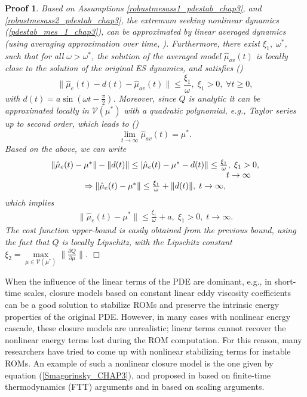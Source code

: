 \documentclass[letterpaper,conference,onecolumn,11pt]{IEEEtran}
\newtheorem{pf}{Proof}
\begin{document}
\begin{pf}
Based on Assumptions \ref{robustmesass1_pdestab_chap3}, and
\ref{robustmesass2_pdestab_chap3}, the extremum seeking nonlinear
dynamics (\ref{pdestab_mes_1_chap3}), can be approximated by
linear averaged dynamics (using averaging approximation over time,
\cite[p. 435, Definition 1]{Rote00}). Furthermore, there exist $
\xi_{1},\;\omega^{*}$, such that for all $\omega>\omega^{*}$, the
solution of the averaged model ${\hat\mu}_{av}(t)$ is locally
close to the solution of the original ES dynamics, and satisfies
(\cite[p. 436]{Rote00})
$$
\|{\hat\mu}_{e}(t)-d(t)-{\hat\mu}_{av}(t)\|
\leq\frac{\xi_{1}}{\omega},\;\xi_{1}>0,\;\forall t\geq 0,
$$
with $d(t)=a \sin(\omega t-\frac{\pi}{2})$. Moreover, since $Q$ is
analytic it can be approximated locally in $\mathcal{V}(\mu^{*})$
with a quadratic polynomial, e.g., Taylor series up to second
order, which leads to (\cite[p. 437]{Rote00})
$$
\lim_{t\rightarrow\infty}{\hat\mu}_{av}(t)=\mu^{*}.
$$
Based on the above, we can write
$$
\begin{array}{c}\|{\hat\mu}_{e}(t)-\mu^{*}\|-\|d(t)\|\leq |{\hat\mu}_{e}(t)-\mu^{*}-d(t)\|
\leq\frac{\xi_{1}}{\omega},\;\xi_{1}>0,\\\hspace{+7cm}t\rightarrow\infty\\
\Rightarrow \|{\hat\mu}_{e}(t)-\mu^{*}\|
\leq\frac{\xi_{1}}{\omega}+\|d(t)\|,\;t\rightarrow\infty,
\end{array}
$$
which implies
$$
\begin{array}{c}
\|{\hat\mu}_{e}(t)-\mu^{*}\|\leq
\frac{\xi_{1}}{\omega}+a,\;\xi_{1}>0,\;t\rightarrow\infty.
\end{array}
$$
The cost function upper-bound is easily obtained from the previous
bound, using the fact that $Q$ is locally Lipschitz, with the
Lipschitz constant
$\xi_{2}=\underset{\mu\in\mathcal{V}(\mu^{*})}\max \|
\frac{\partial{Q}}{\partial\mu} \|$.
 \hspace{+9cm}$\Box$
\end{pf}

When the influence of the linear terms of the PDE are dominant, e.g.,
in short-time scales, closure models based on constant linear eddy
viscosity coefficients can be a good solution to stabilize ROMs and
preserve the intrinsic energy properties of the original PDE. However,
in many cases with nonlinear energy cascade, these closure models are
unrealistic; linear terms cannot recover the nonlinear energy terms
lost during the ROM computation. For this reason, many researchers
have tried to come up with nonlinear stabilizing terms for instable
ROMs. An example of such a nonlinear closure model is the one given by
equation (\ref{Smagorinsky_CHAP3}), and proposed in \cite{NETAL08}
based on finite-time thermodynamics (FTT) arguments and in
\cite{NMT011} based on scaling arguments.
\end{document}

